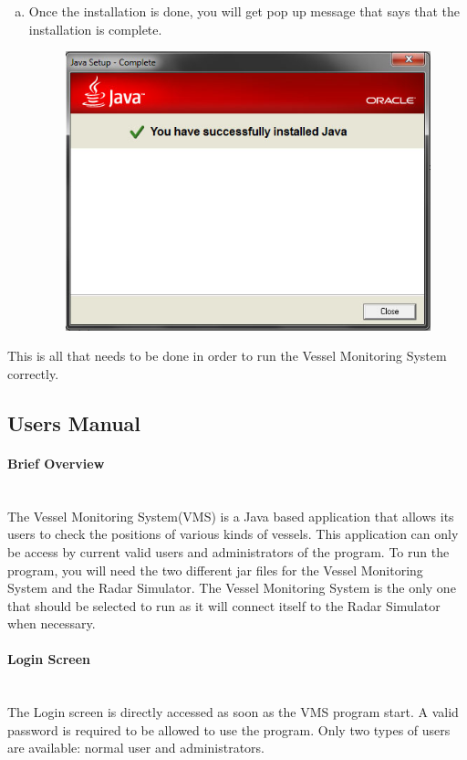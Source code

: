 \documentclass{article}
\begin{document}
\begin{enumerate}[(a)]
\begin{figure}[!htb]
	\end{figure}
  \item Once the installation is done, you will get pop up message that says that the installation is complete.
	\begin{figure}[!htb]
	\centering
	\includegraphics[scale=0.55]{images/javaInstall3.jpg}
	\end{figure}
\end{enumerate}

This is all that needs to be done in order to run the Vessel Monitoring System correctly.
\pagebreak
\subsection{Users Manual}
\paragraph{Brief Overview \\ \\}

The Vessel Monitoring System(VMS) is a Java based application that allows its users to check the positions of various kinds of vessels. This application can only be access by current valid users and administrators of the program. To run the program, you will need the two different jar files for the Vessel Monitoring System and the Radar Simulator. The Vessel Monitoring System is the only one that should be selected to run as it will connect itself to the Radar Simulator when necessary.

\paragraph{Login Screen \\ \\}
The Login screen is directly accessed as soon as the VMS program start. A valid password is required to be allowed to use the program. Only two types of users are available: normal user and administrators.%
\end{document}
